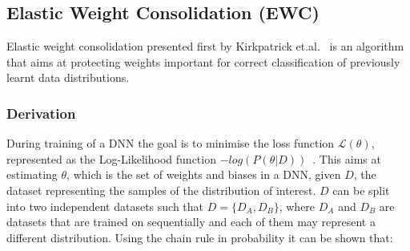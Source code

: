 



\subsection{Elastic Weight Consolidation (EWC)}
Elastic weight consolidation presented first by Kirkpatrick et.al.~\cite{Kirkpatrick2017} is an algorithm that aims at protecting weights important for correct classification of previously learnt data distributions. 
%
%
%
%
%

\subsubsection{Derivation}

%
During training of a DNN the goal is to minimise the loss function $\mathcal{L}(\theta)$, represented as the Log-Likelihood function $-log(P(\theta|D))$~\cite{GoodBengCour2016}.
%
This aims at estimating $\theta$, which is the set of weights and biases in a DNN, given $D$, the dataset representing the samples of the distribution of interest.
%
$D$ can be split into two independent datasets such that $D=\{D_A,D_B\}$, where $D_A$ and $D_B$ are datasets that are trained on sequentially and each of them may represent a different distribution. 
%
Using the chain rule in probability it can be shown that: 

